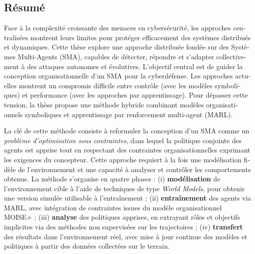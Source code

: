 \begingroup
\let\clearpage\relax
\let\cleardoublepage\relax
\let\cleardoublepage\relax

\begin{otherlanguage}{ngerman}
    \chapter*{Résumé}

    Face à la complexité croissante des menaces en cybersécurité, les approches centralisées montrent leurs limites pour protéger efficacement des systèmes distribués et dynamiques. Cette thèse explore une approche distribuée fondée sur des Systèmes Multi-Agents (SMA), capables de détecter, répondre et s'adapter collectivement à des attaques autonomes et évolutives.
    L'objectif central est de guider la conception organisationnelle d'un SMA pour la cyberdéfense. Les approches actuelles montrent un compromis difficile entre contrôle (avec les modèles symboliques) et performance (avec les approches par apprentissage). Pour dépasser cette tension, la thèse propose une méthode hybride combinant modèles organisationnels symboliques et apprentissage par renforcement multi-agent (MARL).

    La clé de cette méthode consiste à reformuler la conception d'un SMA comme un \textit{problème d'optimisation sous contraintes}, dans lequel la politique conjointe des agents est apprise tout en respectant des contraintes organisationnelles exprimant les exigences du concepteur. Cette approche requiert à la fois une modélisation fidèle de l'environnement et une capacité à analyser et contrôler les comportements obtenus.
    La méthode s'organise en quatre phases : (i) \textbf{modélisation} de l'environnement cible à l'aide de techniques de type \textit{World Models}, pour obtenir une version simulée utilisable à l'entraînement ; (ii) \textbf{entraînement} des agents via MARL, avec intégration de contraintes issues du modèle organisationnel MOISE+ ; (iii) \textbf{analyse} des politiques apprises, en extrayant rôles et objectifs implicites via des méthodes non supervisées sur les trajectoires ; (iv) \textbf{transfert} des résultats dans l'environnement réel, avec mise à jour continue des modèles et politiques à partir des données collectées sur le terrain.


\end{otherlanguage}
